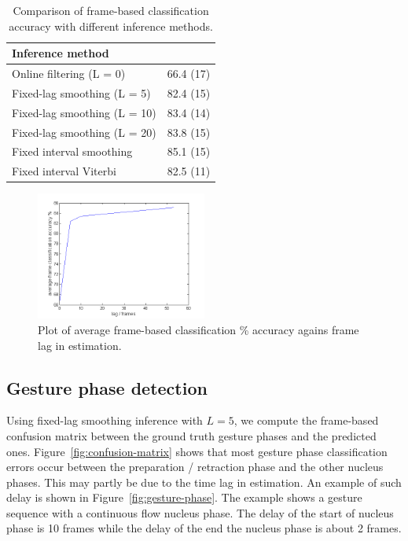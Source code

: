 \documentclass[10pt,twocolumn,letterpaper]{article}
\begin{document}
\begin{table}[tb]
\begin{center}
\begin{tabularx}{0.5\textwidth}{|l|c|}
\hline
Inference method & \multicolumn{1}{p{0.44\columnwidth}|}{\centering{Frame classification \% accuracy (std.)}} \\
\hline\hline
Online filtering (L = 0) & 66.4 (17) \\
Fixed-lag smoothing (L = 5) & 82.4 (15)  \\
Fixed-lag smoothing (L = 10) & 83.4 (14) \\
Fixed-lag smoothing (L = 20) & 83.8 (15) \\
Fixed interval smoothing & 85.1 (15)  \\ 
Fixed interval Viterbi & 82.5 (11)  \\ 
\hline
\end{tabularx}
\end{center}
\caption{Comparison of frame-based classification accuracy with different inference methods.}
\label{tab:comp-inf}
\end{table}

\begin{figure}[tb]
\begin{center}
\includegraphics[width=0.5\textwidth]{figure/comp-inf.png}
\end{center}
   \caption{Plot of average frame-based classification \% accuracy agains frame
   lag in estimation.}
\label{fig:comp-inf}
\end{figure}

\subsection{Gesture phase detection}
Using fixed-lag smoothing inference with $L = 5$, we compute the frame-based confusion matrix
between the ground truth gesture phases and the predicted ones. Figure~\ref{fig:confusion-matrix} shows that most gesture phase classification errors
occur between the preparation / retraction phase and the other nucleus phases. This may
partly be due to the time lag in estimation. An example of such delay is shown in Figure~\ref{fig:gesture-phase}.
The example shows a gesture sequence with a continuous flow nucleus phase. The delay of 
the start of nucleus phase is 10 frames while the delay of the end the nucleus phase is about 2 frames.
\end{document}
